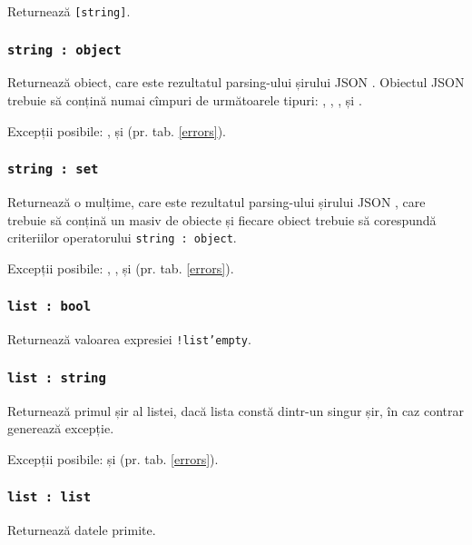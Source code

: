 Returnează \texttt{[string]}.

\subsubsection{\texttt{string : object}}

Returnează obiect, care este rezultatul parsing-ului șirului JSON \str. Obiectul JSON trebuie să conțină numai cîmpuri de următoarele tipuri: \bool, \integer, \double, \str{} și \listtype.

Excepții posibile: ,  și  (pr. tab. \ref{errors}).

\subsubsection{\texttt{string : set}}

Returnează o mulțime, care este rezultatul parsing-ului șirului JSON \str, care trebuie să conțină un masiv de obiecte și fiecare obiect trebuie să corespundă criteriilor operatorului \texttt{string : object}.

Excepții posibile: , ,  și  (pr. tab. \ref{errors}).

\subsubsection{\texttt{list : bool}}

Returnează valoarea expresiei \texttt{!list'empty}.

\subsubsection{\texttt{list : string}}

Returnează primul șir al listei, dacă lista constă dintr-un singur șir, în caz contrar generează excepție.

Excepții posibile:  și  (pr. tab. \ref{errors}).

\subsubsection{\texttt{list : list}}

Returnează datele primite.

